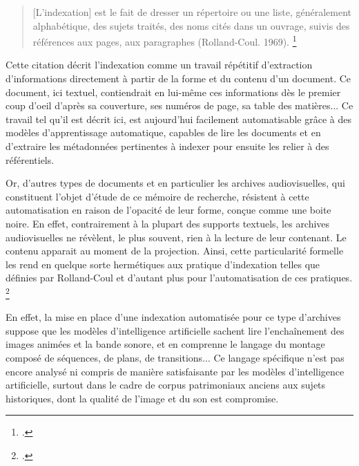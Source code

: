 
	\begin{quote}
		[L'indexation] est le fait de dresser un répertoire ou une liste, généralement alphabétique, des sujets traités, des noms cités dans un ouvrage, suivis des références aux pages, aux paragraphes (Rolland-Coul. 1969).
		\footcite{zotero-item-572}
	\end{quote}
	
	
	Cette citation décrit l'indexation comme un travail répétitif d'extraction d'informations directement à partir de la forme et du contenu d'un document. Ce document, ici textuel, contiendrait en lui-même ces informations dès le premier coup d'oeil d'après sa couverture, ses numéros de page, sa table des matières... Ce travail tel qu'il est décrit ici, est aujourd'hui facilement automatisable grâce à des modèles d'apprentissage automatique, capables de lire les documents et en d'extraire les métadonnées pertinentes à indexer pour ensuite les relier à des référentiels. 
	
	Or, d'autres types de documents et en particulier les archives audiovisuelles, qui constituent l'objet d'étude de ce mémoire de recherche, résistent à cette automatisation en raison de l'opacité de leur forme, conçue comme une boite noire. En effet, contrairement à la plupart des supports textuels, les archives audiovisuelles ne révèlent, le plus souvent, rien à la lecture de leur contenant. Le contenu apparait au moment de la projection. Ainsi, cette particularité formelle les rend en quelque sorte hermétiques aux pratique d'indexation telles que définies par Rolland-Coul et d'autant plus pour l'automatisation de ces pratiques. \footcite{zotero-item-582}
	
	En effet, la mise en place d'une indexation automatisée pour ce type d'archives suppose que les modèles d'intelligence artificielle sachent lire l'enchaînement des images animées et la bande sonore, et en comprenne le langage du montage composé de séquences, de plans, de transitions... Ce langage spécifique n'est pas encore analysé ni compris de manière satisfaisante par les modèles d'intelligence artificielle, surtout dans le cadre de corpus patrimoniaux anciens aux sujets historiques, dont la qualité de l'image et du son est compromise. 
	
